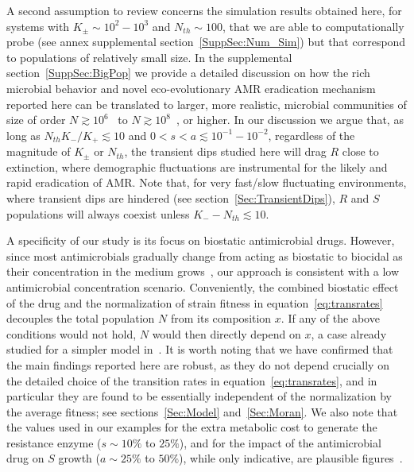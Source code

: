 \documentclass{article}
\begin{document}
A second assumption to review concerns the simulation results obtained here, for systems with \(K_{\pm}\sim10^{2}-10^{3}\) and \(N_{th}\sim100\), that we are able to computationally probe (see annex supplemental section~\ref{SuppSec:Num_Sim}) but that correspond to populations of relatively small size. In the supplemental section~\ref{SuppSec:BigPop} we provide a detailed discussion on how the rich microbial behavior and novel eco-evolutionary AMR eradication mechanism reported here can be translated to larger, more realistic, microbial communities of size of  order \(N\gtrsim10^{6}\)~\cite{sanchez2013feedback} to  \(N\gtrsim10^{8}\)~\cite{Coates18, smith1956experimental, canetti1956dynamic, feldman1976concentrations, palaci2007cavitary}, or higher. In our discussion we argue that, as long as \(N_{th}K_{-}/K_{+}\lesssim10\) and \(0<s<a\lesssim 10^{-1}-10^{-2}\), regardless of the magnitude of \(K_{\pm}\) or \(N_{th}\), the transient dips studied here will drag $R$ close to extinction, where demographic fluctuations are instrumental for the likely and rapid eradication of AMR. Note that, for very fast/slow fluctuating environments, where transient dips are hindered (see section~\ref{Sec:TransientDips}), \(R\) and \(S\) populations will always coexist unless \(K_{-}-N_{th}\lesssim10\).

A specificity of our study is its focus on biostatic antimicrobial drugs. However, since most antimicrobials gradually change  from acting as biostatic to biocidal as their concentration in the medium grows~\cite{hughes2012selection, andersson2007biological, sanmillan2017fitness}, our approach is consistent with a low antimicrobial concentration scenario. Conveniently, the combined biostatic effect of the drug and the normalization of strain fitness in equation~\eqref{eq:transrates}~\cite{Ewens,Blythe07} decouples the total population \(N\) from its composition \(x\). If any of the above conditions would not hold, \(N\) would then directly depend on \(x\), a case already studied for a simpler model in~\cite{wienand2017evolution, wienand2018eco}. It is worth noting that we have confirmed that the main findings reported here are robust, as they do not depend crucially on the detailed choice of the transition rates in equation~\eqref{eq:transrates}, and in particular they are found to be essentially independent of the normalization by the average fitness; see sections~\ref{Sec:Model} and~\ref{Sec:Moran}. We also note that the values used in our examples for the extra metabolic cost to generate the resistance enzyme (\(s\sim10\%\) to \(25\%\)), and for the impact of the antimicrobial drug on $S$ growth (\(a\sim25\%\) to \(50\%\)), while only indicative, are plausible figures~\cite{van2011novo, melnyk2015fitness}.
\end{document}
